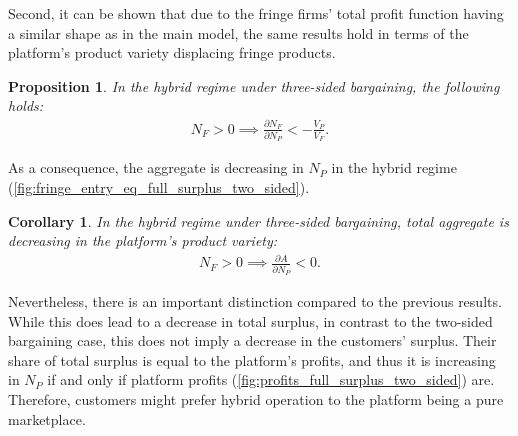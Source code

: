 \documentclass[a4paper]{article}
\newtheorem{proposition}{Proposition}
\newtheorem{corollary}{Corollary}
\begin{document}
Second, it can be shown that due to the fringe firms' total profit function having a similar shape as in the main model, the same results hold in terms of the platform's product variety displacing fringe products.
\begin{proposition}
    In the hybrid regime under three-sided bargaining, the following holds:
    \begin{align*}
        N_F > 0 \implies \frac{\partial N_F}{\partial N_P} < -\frac{V_P}{V_F}.
    \end{align*}
\end{proposition}
As a consequence, the aggregate is decreasing in $N_P$ in the hybrid regime (\cref{fig:fringe_entry_eq_full_surplus_two_sided}).
\begin{corollary}
    In the hybrid regime under three-sided bargaining, total aggregate is decreasing in the platform's product variety:
    \begin{align*}
        N_F > 0 \implies \frac{\partial A}{\partial N_P} < 0.
    \end{align*}
\end{corollary}

Nevertheless, there is an important distinction compared to the previous results.
While this does lead to a decrease in total surplus, in contrast to the two-sided bargaining case, this does not imply a decrease in the customers' surplus.
Their share of total surplus is equal to the platform's profits, and thus it is increasing in $N_P$ if and only if platform profits (\cref{fig:profits_full_surplus_two_sided}) are.
Therefore, customers might prefer hybrid operation to the platform being a pure marketplace.
\end{document}
